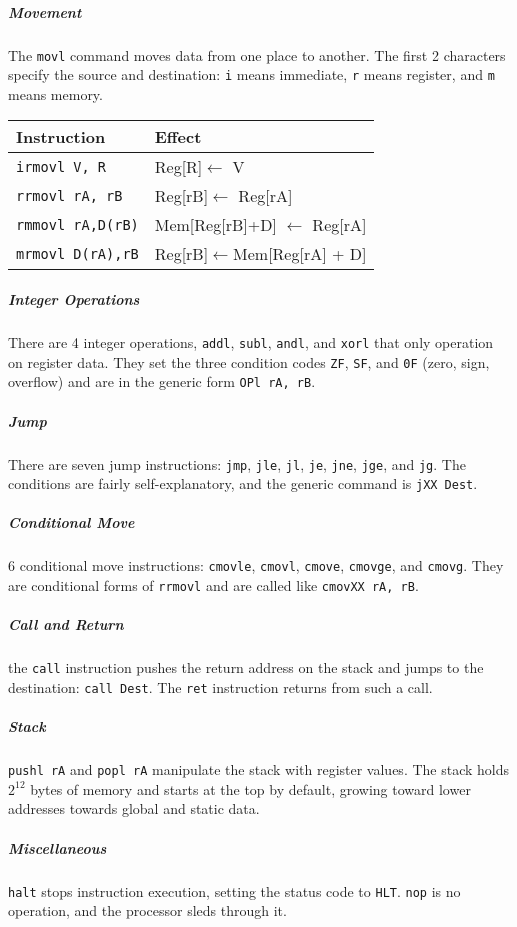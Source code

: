 \documentclass[11pt]{article}
\begin{document}
	\subparagraph{Movement} The \verb|movl| command moves data from one place to another. The first 2 characters specify the source and destination: \verb|i| means immediate, \verb|r| means register, and \verb|m| means memory.
	\begin{center}
	\begin{tabular}{l|l}
		Instruction	&	Effect\\\hline
		
		\verb|irmovl V, R|	& Reg[R]$\leftarrow$ V\\
		\verb|rrmovl rA, rB|	&	Reg[rB]$\leftarrow$ Reg[rA]\\
		\verb|rmmovl rA,D(rB)|	&	Mem[Reg[rB]+D] $\leftarrow$ Reg[rA]\\
		\verb|mrmovl D(rA),rB|	&	Reg[rB]$\leftarrow$Mem[Reg[rA] + D]\\
	\end{tabular}
	\end{center}
	
	\subparagraph{Integer Operations} There are 4 integer operations, \verb|addl|, \verb|subl|, \verb|andl|, and \verb|xorl| that only operation on register data. They set the three condition codes \verb|ZF|, \verb|SF|, and \verb|0F| (zero, sign, overflow) and are in the generic form \verb|OPl rA, rB|.
	
	\subparagraph{Jump} There are seven jump instructions: \verb|jmp|, \verb|jle|, \verb|jl|, \verb|je|, \verb|jne|, \verb|jge|, and \verb|jg|. The conditions are fairly self-explanatory, and the generic command is \verb|jXX Dest|.
	
	\subparagraph{Conditional Move}6 conditional move instructions: \verb|cmovle|, \verb|cmovl|, \verb|cmove|, \verb|cmovge|, and \verb|cmovg|. They are conditional forms of \verb|rrmovl| and are called like \verb|cmovXX rA, rB|.
	
	\subparagraph{Call and Return} the \verb|call| instruction pushes the return address on the stack and jumps to the destination: \verb|call Dest|. The \verb|ret| instruction returns from such a call.
	
	\subparagraph{Stack} \verb|pushl rA| and \verb|popl rA| manipulate the stack with register values. The stack holds $2^12$ bytes of memory and starts at the top by default, growing toward lower addresses towards global and static data. 
	
	\subparagraph{Miscellaneous} \verb|halt| stops instruction execution, setting the status code to \verb|HLT|. \verb|nop| is no operation, and the processor sleds through it.
	
\end{document}
